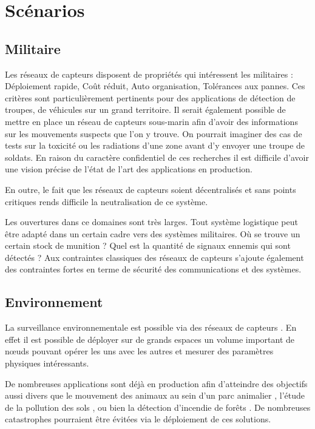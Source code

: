 \section{Scénarios}

\subsection{Militaire}

Les réseaux de capteurs disposent de propriétés qui intéressent les militaires
: Déploiement rapide, Coût réduit, Auto organisation, Tolérances aux pannes.
Ces critères sont particulièrement pertinents pour des applications de
détection de troupes, de véhicules sur un grand territoire. Il serait également
possible de mettre en place un réseau de capteurs sous-marin
\cite{voigt07sensor} afin d'avoir des informations sur les mouvements suspects
que l'on y trouve.  On pourrait imaginer des cas de tests sur la toxicité ou
les radiations d'une zone avant d'y envoyer une troupe de soldats.  En raison
du caractère confidentiel de ces recherches il est difficile d'avoir une vision
précise de l'état de l'art des applications en production.

En outre, le fait que les réseaux de capteurs soient décentralisés et sans
points critiques rends difficile la neutralisation de ce système.

Les ouvertures dans ce domaines sont très larges. Tout système logistique peut
être adapté dans un certain cadre vers des systèmes militaires. Où se trouve un
certain stock de munition ? Quel est la quantité de signaux ennemis qui sont
détectés ? Aux contraintes classiques des réseaux de capteurs s'ajoute
également des contraintes fortes en terme de sécurité des communications et des
systèmes.

\subsection{Environnement}

La surveillance environnementale est possible via des réseaux de capteurs
\cite{ecology}.  En effet il est possible de déployer sur de grands espaces un
volume important de nœuds pouvant opérer les uns avec les autres et mesurer des
paramètres physiques intéressants.

De nombreuses applications sont déjà en production afin d'atteindre des
objectifs aussi divers que le mouvement des animaux au sein d'un parc animalier
\cite{Cerpa:2001:HMA:371626.371720}, l'étude de la pollution des sols
\cite{Ham92}, ou bien la détection d'incendie de forêts \cite{forest, forest2}.
De nombreuses catastrophes pourraient être évitées via le déploiement de ces
solutions.

